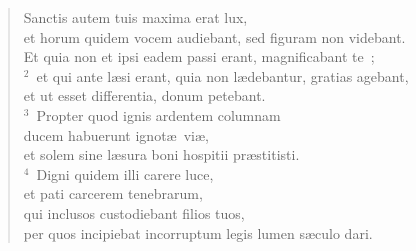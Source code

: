 \begin{flushleft}\begin{verse}\vspace{-19pt}\hspace{6pt}Sanctis autem tuis maxima erat lux,\\\hspace{6pt} et horum quidem vocem audiebant, sed figuram non videbant.\\ Et quia non et ipsi eadem passi erant, magnificabant te~;\\
${}^{2}$~et qui ante l\ae si erant, quia non l\ae debantur, gratias agebant,\\ et ut esset differentia, donum petebant.\\
${}^{3}$~Propter quod ignis ardentem columnam\\ ducem habuerunt ignot\ae\ vi\ae ,\\ et solem sine l\ae sura boni hospitii pr\ae stitisti.\\
${}^{4}$~Digni quidem illi carere luce,\\ et pati carcerem tenebrarum,\\ qui inclusos custodiebant filios tuos,\\ per quos incipiebat incorruptum legis lumen s\ae culo dari.\end{verse}\end{flushleft}


